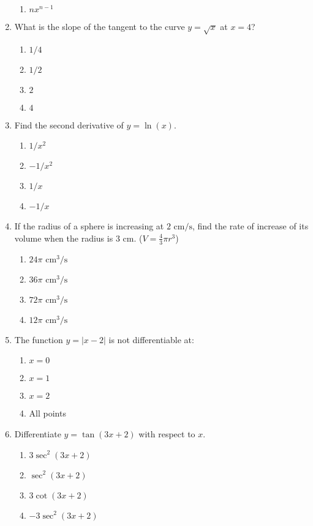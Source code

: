 \begin{multicols}{2}
\begin{enumerate}[label={\arabic*.}]
\begin{enumerate}[label={\Alph*.}]
        \item \(nx^{n-1}\)
      \end{enumerate}
    \item What is the slope of the tangent to the curve \(y = \sqrt{x}\) at \(x=4\)?
      \begin{enumerate}[label={\Alph*.}]
        \item \(1/4\)
        \item \(1/2\)
        \item \(2\)
        \item \(4\)
      \end{enumerate}
    \item Find the second derivative of \(y = \ln(x)\).
      \begin{enumerate}[label={\Alph*.}]
        \item \(1/x^2\)
        \item \(-1/x^2\)
        \item \(1/x\)
        \item \(-1/x\)
      \end{enumerate}
    \item If the radius of a sphere is increasing at \(2 \text{ cm/s}\), find the rate of increase of its volume when the radius is \(3 \text{ cm}\). (\(V=\frac{4}{3}\pi r^3\))
      \begin{enumerate}[label={\Alph*.}]
        \item \(24\pi \text{ cm}^3/\text{s}\)
        \item \(36\pi \text{ cm}^3/\text{s}\)
        \item \(72\pi \text{ cm}^3/\text{s}\)
        \item \(12\pi \text{ cm}^3/\text{s}\)
      \end{enumerate}
    \item The function \(y = |x-2|\) is not differentiable at:
      \begin{enumerate}[label={\Alph*.}]
        \item \(x=0\)
        \item \(x=1\)
        \item \(x=2\)
        \item All points
      \end{enumerate}
    \item Differentiate \(y = \tan(3x+2)\) with respect to \(x\).
      \begin{enumerate}[label={\Alph*.}]
        \item \(3\sec^2(3x+2)\)
        \item \(\sec^2(3x+2)\)
        \item \(3\cot(3x+2)\)
        \item \(-3\sec^2(3x+2)\)
      \end{enumerate}
  \end{enumerate}
\end{multicols}
